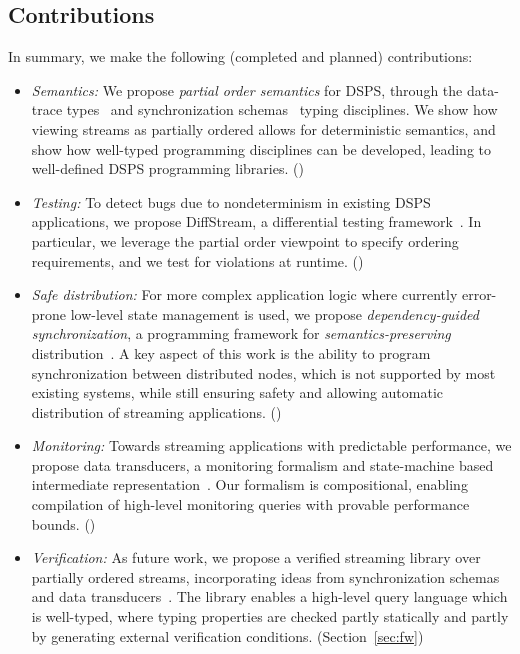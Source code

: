 \subsection{Contributions}

In summary, we make the following (completed and planned) contributions:

\begin{itemize}
\item
\emph{Semantics:}
We propose \emph{partial order semantics} for DSPS,
through the data-trace types~ and synchronization schemas~ typing disciplines.
We show how viewing streams as partially ordered allows for deterministic semantics,
and show how well-typed programming disciplines can be developed,
leading to well-defined DSPS programming libraries.
()

\item
\emph{Testing:}
To detect bugs due to nondeterminism in existing DSPS applications,
we propose DiffStream, a differential testing framework~.
In particular, we leverage the partial order viewpoint to specify
ordering requirements, and we test for violations at runtime.
()

\item
\emph{Safe distribution:}
For more complex application logic where currently error-prone
low-level state management is used,
we propose \emph{dependency-guided synchronization},
a programming framework for \emph{semantics-preserving} distribution~.
A key aspect of this work is the ability to program
synchronization between distributed nodes, which is not supported
by most existing systems,
while still ensuring safety and allowing automatic distribution
of streaming applications.
()

\item
\emph{Monitoring:}
Towards streaming applications with predictable performance,
we propose data transducers, a monitoring formalism and state-machine based intermediate representation~.
Our formalism is compositional, enabling compilation of high-level
monitoring queries with provable performance bounds.
()

\item
\emph{Verification:}
As future work, we propose a verified streaming library
over partially ordered streams, incorporating ideas from synchronization schemas~ and data transducers~.
The library enables a high-level query language which is well-typed,
where typing properties are checked partly statically and partly by
generating external verification conditions.
(Section~\ref{sec:fw})
\end{itemize}
